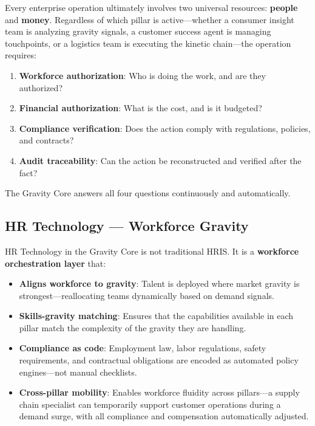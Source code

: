 \documentclass[11pt,a4paper,twocolumn]{article}
\begin{document}
Every enterprise operation ultimately involves two universal resources: \textbf{people} and \textbf{money}. Regardless of which pillar is active---whether a consumer insight team is analyzing gravity signals, a customer success agent is managing touchpoints, or a logistics team is executing the kinetic chain---the operation requires:

\begin{enumerate}[leftmargin=1.5em]
  \item \textbf{Workforce authorization}: Who is doing the work, and are they authorized?
  \item \textbf{Financial authorization}: What is the cost, and is it budgeted?
  \item \textbf{Compliance verification}: Does the action comply with regulations, policies, and contracts?
  \item \textbf{Audit traceability}: Can the action be reconstructed and verified after the fact?
\end{enumerate}

The Gravity Core answers all four questions continuously and automatically.

\subsection{HR Technology --- Workforce Gravity}

HR Technology in the Gravity Core is not traditional HRIS. It is a \textbf{workforce orchestration layer} that:

\begin{itemize}[leftmargin=1.5em]
  \item \textbf{Aligns workforce to gravity}: Talent is deployed where market gravity is strongest---reallocating teams dynamically based on demand signals.
  \item \textbf{Skills-gravity matching}: Ensures that the capabilities available in each pillar match the complexity of the gravity they are handling.
  \item \textbf{Compliance as code}: Employment law, labor regulations, safety requirements, and contractual obligations are encoded as automated policy engines---not manual checklists.
  \item \textbf{Cross-pillar mobility}: Enables workforce fluidity across pillars---a supply chain specialist can temporarily support customer operations during a demand surge, with all compliance and compensation automatically adjusted.
\end{itemize}
\end{document}
